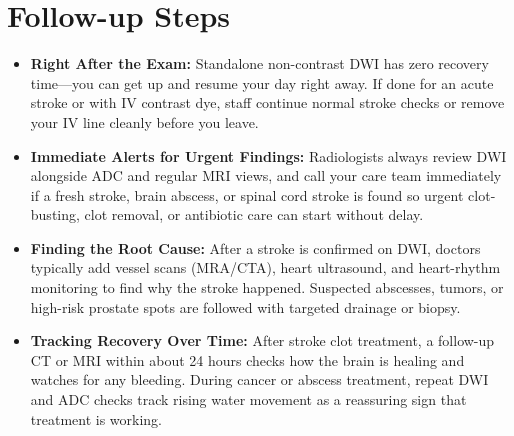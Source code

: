 \section{Follow-up Steps}
\begin{itemize}
\item \textbf{Right After the Exam:} Standalone non-contrast DWI has zero recovery time---you can get up and resume your day right away. If done for an acute stroke or with IV contrast dye, staff continue normal stroke checks or remove your IV line cleanly before you leave.
\item \textbf{Immediate Alerts for Urgent Findings:} Radiologists always review DWI alongside ADC and regular MRI views, and call your care team immediately if a fresh stroke, brain abscess, or spinal cord stroke is found so urgent clot-busting, clot removal, or antibiotic care can start without delay.
\item \textbf{Finding the Root Cause:} After a stroke is confirmed on DWI, doctors typically add vessel scans (MRA/CTA), heart ultrasound, and heart-rhythm monitoring to find why the stroke happened. Suspected abscesses, tumors, or high-risk prostate spots are followed with targeted drainage or biopsy.
\item \textbf{Tracking Recovery Over Time:} After stroke clot treatment, a follow-up CT or MRI within about 24 hours checks how the brain is healing and watches for any bleeding. During cancer or abscess treatment, repeat DWI and ADC checks track rising water movement as a reassuring sign that treatment is working.
\end{itemize}

